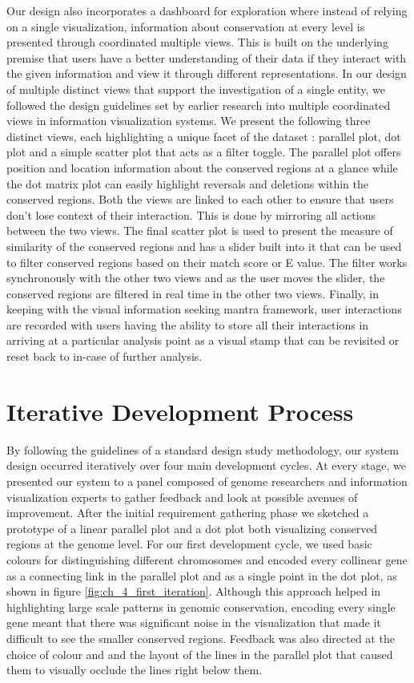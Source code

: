 Our design also incorporates a dashboard for exploration where instead of relying on a single visualization, information about conservation at every level is presented through coordinated multiple views. This is built on the underlying premise that users have a better understanding of their data if they interact with the given information and view it through different representations\cite{Roberts}. In our design of multiple distinct views that support the investigation of a single entity, we followed the design guidelines set by earlier research into multiple coordinated views in information visualization systems\cite{WangBaldonado}. We present the following three distinct views, each highlighting a unique facet of the dataset : parallel plot, dot plot and a simple scatter plot that acts as a filter toggle. The parallel plot offers position and location information about the conserved regions at a glance while the dot matrix plot can easily highlight reversals and deletions within the conserved regions. Both the views are linked to each other to ensure that users don't lose context of their interaction. This is done by mirroring all actions between the two views. The final scatter plot is used to present the measure of similarity of the conserved regions and has a slider built into it that can be used to filter conserved regions based on their match score or E value. The filter works synchronously with the other two views and as the user moves the slider, the conserved regions are filtered in real time in the other two views. Finally, in keeping with the visual information seeking mantra framework, user interactions are recorded with users having the ability to store all their interactions in arriving at a particular analysis point as a visual stamp that can be revisited or reset back to in-case of further analysis.

\section{Iterative Development Process}
By following the guidelines of a standard design study methodology\cite{5290695}, our system design occurred iteratively over four main development cycles. At every stage, we presented our system to a panel composed of genome researchers and information visualization experts to gather feedback and look at possible avenues of improvement. After the initial requirement gathering phase we sketched a prototype of a linear parallel plot and a dot plot both visualizing conserved regions at the genome level. For our first development cycle, we used basic colours for distinguishing different chromosomes and encoded every collinear gene as a connecting link in the parallel plot and as a single point in the dot plot, as shown in figure \ref{fig:ch_4_first_iteration}. Although this approach helped in highlighting large scale patterns in genomic conservation, encoding every single gene meant that there was significant noise in the visualization that made it difficult to see the smaller conserved regions. Feedback was also directed at the choice of colour and and the layout of the lines in the parallel plot that caused them to visually occlude the lines right below them.

